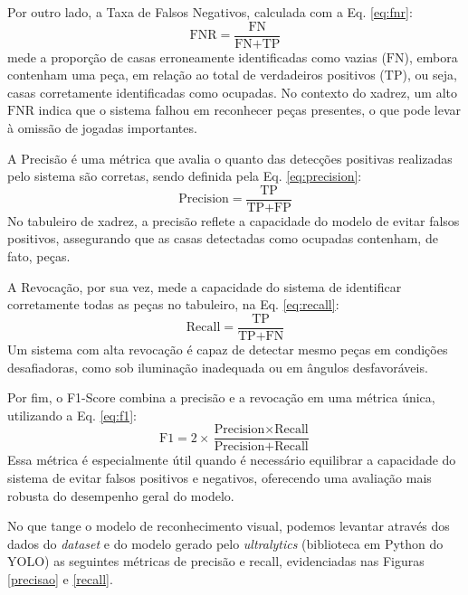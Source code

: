 \documentclass[journal]{IEEEtran} %
\begin{document}
Por outro lado, a Taxa de Falsos Negativos, calculada com a Eq. \ref{eq:fnr}:
\begin{equation}
\text{FNR} = \frac{\text{FN}}{\text{FN} + \text{TP}}
\label{eq:fnr}
\end{equation}
mede a proporção de casas erroneamente identificadas como vazias (\(\text{FN}\)), embora contenham uma peça, em relação ao total de verdadeiros positivos (\(\text{TP}\)), ou seja, casas corretamente identificadas como ocupadas. No contexto do xadrez, um alto \(\text{FNR}\) indica que o sistema falhou em reconhecer peças presentes, o que pode levar à omissão de jogadas importantes.

A Precisão é uma métrica que avalia o quanto das detecções positivas realizadas pelo sistema são corretas, sendo definida pela Eq. \ref{eq:precision}:
\begin{equation}
\text{Precision} = \frac{\text{TP}}{\text{TP} + \text{FP}}
\label{eq:precision}
\end{equation}
No tabuleiro de xadrez, a precisão reflete a capacidade do modelo de evitar falsos positivos, assegurando que as casas detectadas como ocupadas contenham, de fato, peças.

A Revocação, por sua vez, mede a capacidade do sistema de identificar corretamente todas as peças no tabuleiro, na Eq. \ref{eq:recall}:
\begin{equation}
\text{Recall} = \frac{\text{TP}}{\text{TP} + \text{FN}}
\label{eq:recall}
\end{equation}
Um sistema com alta revocação é capaz de detectar mesmo peças em condições desafiadoras, como sob iluminação inadequada ou em ângulos desfavoráveis.

Por fim, o F1-Score combina a precisão e a revocação em uma métrica única, utilizando a Eq. \ref{eq:f1}:
\begin{equation}
\text{F1} = 2 \times \frac{\text{Precision} \times \text{Recall}}{\text{Precision} + \text{Recall}}
\label{eq:f1}
\end{equation}
Essa métrica é especialmente útil quando é necessário equilibrar a capacidade do sistema de evitar falsos positivos e negativos, oferecendo uma avaliação mais robusta do desempenho geral do modelo.

No que tange o modelo de reconhecimento visual, podemos levantar através dos dados do \textit{dataset} e do modelo gerado pelo \textit{ultralytics} (biblioteca em Python do YOLO) as seguintes métricas de precisão e recall, evidenciadas nas Figuras \ref{precisao} e \ref{recall}.
\end{document}
